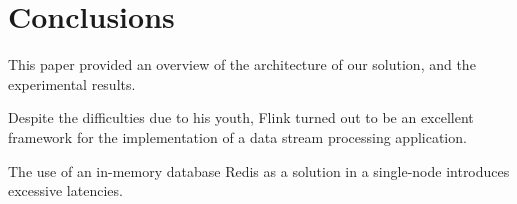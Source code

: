 \section{Conclusions}
\label{sec:conclusions}

This paper provided an overview of the architecture of our solution, and the experimental results. 

Despite the difficulties due to his youth, Flink turned out to be an excellent framework for the implementation of a data stream processing application.

The use of an in-memory database Redis as a solution in a single-node introduces excessive latencies.

